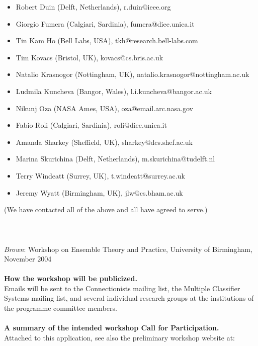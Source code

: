 \documentclass[a4]{article}
\begin{document}
\begin{itemize}
\setlength{\itemsep}{-1mm}
\item{  Robert Duin (Delft, Netherlands), r.duin@ieee.org}
\item{  Giorgio Fumera (Calgiari, Sardinia), fumera@diee.unica.it}
\item{  Tin Kam Ho (Bell Labs, USA), tkh@research.bell-labs.com}
\item{  Tim Kovacs (Bristol, UK), kovacs@cs.bris.ac.uk}
\item{  Natalio Krasnogor (Nottingham, UK), natalio.krasnogor@nottingham.ac.uk}
\item{  Ludmila Kuncheva (Bangor, Wales), l.i.kuncheva@bangor.ac.uk}
\item{  Nikunj Oza (NASA Ames, USA), oza@email.arc.nasa.gov}
\item{  Fabio Roli (Calgiari, Sardinia), roli@diee.unica.it}
\item{  Amanda Sharkey (Sheffield, UK), sharkey@dcs.shef.ac.uk}
\item{  Marina Skurichina (Delft, Netherlands), m.skurichina@tudelft.nl}
\item{  Terry Windeatt (Surrey, UK), t.windeatt@surrey.ac.uk}
\item{  Jeremy Wyatt (Birmingham, UK), jlw@cs.bham.ac.uk}
\end{itemize}
(We have contacted all of the above and all have agreed to serve.)\\
\\
\\
\\
{\em Brown}: Workshop on Ensemble Theory and Practice, University of Birmingham,
November 2004\\
\\
{\bf How the workshop will be publicized.}\\
Emails will be sent to the Connectionists mailing list, the Multiple Classifier Systems mailing list, and 
several individual research groups at the institutions of the programme committee members.\\
\\
{\bf A summary of the intended workshop Call for Participation.}\\
Attached to this application, see also the preliminary workshop website at:\\
\end{document}

